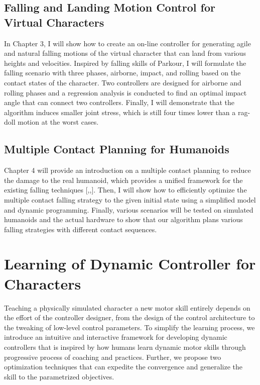 \subsection{Falling and Landing Motion Control for Virtual Characters}
In Chapter 3, I will show how to create an on-line controller for generating 
agile and natural falling motions of the virtual character that can land from 
various heights and velocities.
Inspired by falling skills of Parkour, I will formulate the falling scenario
with three phases, airborne, impact, and rolling based on the contact states 
of the character.
Two controllers are designed for airborne and rolling phases and a regression
analysis is conducted to find an optimal impact angle that can connect two
controllers.
Finally, I will demonstrate that the algorithm induces smaller joint stress,
which is still four times lower than a rag-doll motion at the worst cases.

\subsection{Multiple Contact Planning for Humanoids}
Chapter 4 will provide an introduction on a multiple contact planning to
reduce the damage to the real humanoid, which provides a unified framework
for the existing falling techniques [,,].
Then, I will show how to efficiently optimize the multiple contact falling
strategy to the given initial state using a simplified model and dynamic 
programming.
Finally, various scenarios will be tested on simulated humanoids and the
actual hardware to show that our algorithm plans various falling strategies
with different contact sequences.

\section{Learning of Dynamic Controller for Characters}
Teaching a physically simulated character a new motor skill entirely depends 
on the effort of the controller designer, from the design of the control 
architecture to the tweaking of low-level control parameters.
To simplify the learning process, we introduce an intuitive and 
interactive framework for developing dynamic controllers that is inspired by
how humans learn dynamic motor skills through progressive process of coaching
and practices.
Further, we propose two optimization techniques that can expedite the convergence and generalize the skill to the parametrized objectives.

